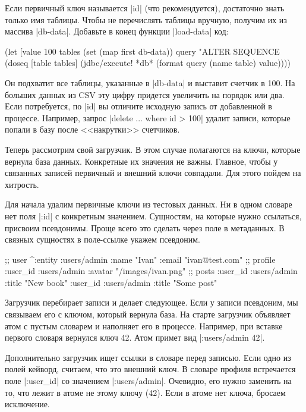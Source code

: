 Если первичный ключ называется \spverb|id| (что рекомендуется), достаточно знать
только имя таблицы. Чтобы не перечислять таблицы вручную, получим их из массива
\spverb|db-data|. Добавьте в конец функции \spverb|load-data| код:

\begin{english}
  \begin{clojure}
(let [value 100
      tables (set (map first db-data))
      query "ALTER SEQUENCE %
  (doseq [table tables]
    (jdbc/execute! *db* (format query (name table) value))))
  \end{clojure}
\end{english}

Он подхватит все таблицы, указанные в \spverb|db-data| и выставит счетчик в 100.
На больших данных из CSV эту цифру придется увеличить на порядок или два. Если
потребуется, по \spverb|id| вы отличите исходную запись от добавленной в
процессе. Например, запрос \spverb|delete ... where id > 100| удалит
записи, которые попали в базу после <<накрутки>> счетчиков.

Теперь рассмотрим свой загрузчик. В этом случае полагаются на ключи, которые
вернула база данных. Конкретные их значения не важны. Главное, чтобы у связанных
записей первичный и внешний ключи совпадали. Для этого пойдем на хитрость.

Для начала удалим первичные ключи из тестовых данных. Ни в одном словаре нет
поля \spverb|:id| с конкретным значением. Сущностям, на которые нужно ссылаться,
присвоим псевдонимы. Проще всего это сделать через поле в метаданных. В связных
сущностях в поле-ссылке укажем псевдоним.

\begin{english}
  \begin{clojure}
;; user
^{:entity :users/admin} {:name "Ivan" :email "ivan@test.com"}
;; profile
{:user_id :users/admin :avatar "/images/ivan.png"}
;; posts
{:user_id :users/admin :title "New book"}
{:user_id :users/admin :title "Some post"}
  \end{clojure}
\end{english}

Загрузчик перебирает записи и делает следующее. Если у записи псевдоним, мы
связываем его с ключом, который вернула база. На старте загрузчик объявляет атом
с пустым словарем и наполняет его в процессе. Например, при вставке первого
словаря вернулся ключ 42. Атом примет вид \spverb|{:users/admin 42}|.

Дополнительно загрузчик ищет ссылки в словаре перед записью. Если одно из полей
кейворд, считаем, что это внешний ключ. В словаре профиля встречается поле
\spverb|:user_id| со значением \spverb|:users/admin|. Очевидно, его нужно
заменить на то, что лежит в атоме не этому ключу (42). Если в атоме нет ключа,
бросаем исключение.

